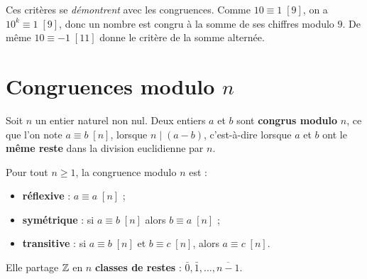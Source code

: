 \begin{remarque}
Ces critères se \emph{démontrent} avec les congruences. Comme $10\equiv 1\;[9]$, on a $10^k\equiv 1\;[9]$, donc un nombre est congru à la somme de ses chiffres modulo $9$. De même $10\equiv -1\;[11]$ donne le critère de la somme alternée.
\end{remarque}

\section{Congruences modulo $n$}

\begin{definition}[Congruence]
Soit $n$ un entier naturel non nul. Deux entiers $a$ et $b$ sont \textbf{congrus modulo} $n$, ce que l'on note $a\equiv b\;[n]$, lorsque $n\mid (a-b)$, c'est-à-dire lorsque $a$ et $b$ ont le \textbf{même reste} dans la division euclidienne par $n$.
\end{definition}

\begin{propriete}
Pour tout $n\ge 1$, la congruence modulo $n$ est :
\begin{itemize}
\item \textbf{réflexive} : $a\equiv a\;[n]$ ;
\item \textbf{symétrique} : si $a\equiv b\;[n]$ alors $b\equiv a\;[n]$ ;
\item \textbf{transitive} : si $a\equiv b\;[n]$ et $b\equiv c\;[n]$, alors $a\equiv c\;[n]$.
\end{itemize}
Elle partage $\mathbb{Z}$ en $n$ \textbf{classes de restes} : $\bar0,\bar1,\dots,\overline{n-1}$.
\end{propriete}

\begin{illus}
\end{illus}

